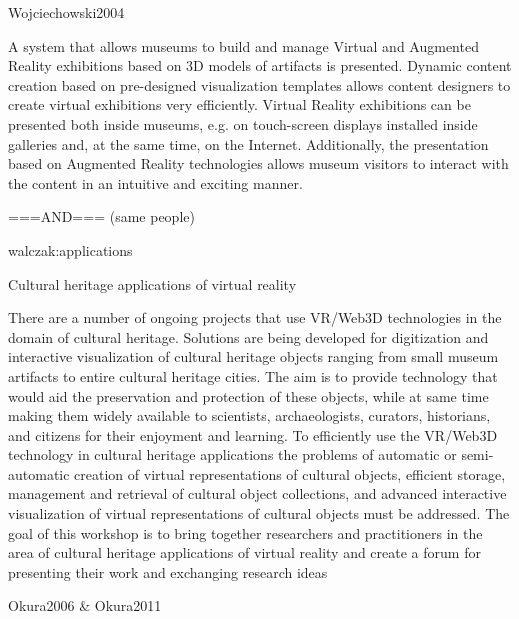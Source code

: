 
Wojciechowski2004

A system that allows museums to build and manage Virtual and
Augmented Reality exhibitions based on 3D models of artifacts is
presented. Dynamic content creation based on pre-designed
visualization templates allows content designers to create virtual
exhibitions very efficiently. Virtual Reality exhibitions can be
presented both inside museums, e.g. on touch-screen displays
installed inside galleries and, at the same time, on the Internet.
Additionally, the presentation based on Augmented Reality
technologies allows museum visitors to interact with the content
in an intuitive and exciting manner.

===AND=== (same people)

walczak:applications

Cultural heritage applications of virtual reality

There are a number of ongoing projects that use VR/Web3D technologies in the domain of cultural heritage. Solutions are being
developed for digitization and interactive visualization of cultural heritage objects ranging from small museum artifacts to entire
cultural heritage cities. The aim is to provide technology that would aid the preservation and protection of these objects, while at same
time making them widely available to scientists, archaeologists, curators, historians, and citizens for their enjoyment and learning.
To efficiently use the VR/Web3D technology in cultural heritage applications the problems of automatic or semi-automatic creation of
virtual representations of cultural objects, efficient storage, management and retrieval of cultural object collections, and advanced
interactive visualization of virtual representations of cultural objects must be addressed.
The goal of this workshop is to bring together researchers and practitioners in the area of cultural heritage applications of virtual
reality and create a forum for presenting their work and exchanging research ideas


Okura2006 \& Okura2011

